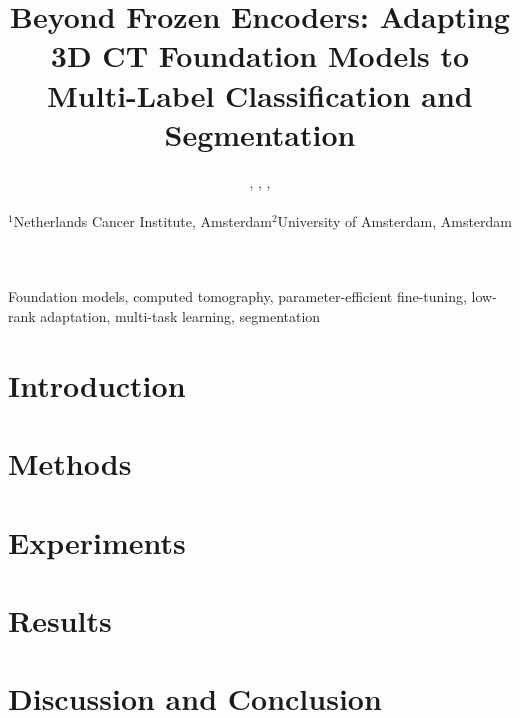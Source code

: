\documentclass{midl}
\title[Beyond frozen encoders]{Beyond Frozen Encoders: Adapting 3D CT Foundation Models to Multi-Label Classification and Segmentation}
\author[Yiasemis et al.]{%
\Name{George Yiasemis\midljointauthortext{Equal contribution.}\nametag{$^{1}$}},
\Name{Razvan-Andrei Matisan\midlotherjointauthor\nametag{$^{1}$}},
\Name{Cees Snoek\nametag{$^{2}$}},
\Name{Jonas Teuwen\nametag{$^{1}$}}\\
\Email{g.yiasemis@nki.nl}\\
\addr $^{1}$Netherlands Cancer Institute, Amsterdam\qquad $^{2}$University of Amsterdam, Amsterdam
}
\begin{document}
\maketitle

\begin{abstract}

\end{abstract}

\begin{keywords}
Foundation models, computed tomography, parameter-efficient fine-tuning, low-rank adaptation, multi-task learning, segmentation
\end{keywords}

\setlength{\textfloatsep}{6pt plus 2pt minus 2pt}\setlength{\floatsep}{6pt plus 2pt minus 2pt}\setlength{\intextsep}{6pt plus 2pt minus 2pt}
\section{Introduction}
\label{sec:intro}


\section{Methods}
\label{sec:methods}


\section{Experiments}
\label{sec:setup}


\section{Results}
\label{sec:results}


\section{Discussion and Conclusion}
\label{sec:discussion}\label{sec:guide}


\clearpage
\setlength{\textfloatsep}{10pt plus 2pt minus 4pt}\setlength{\floatsep}{8pt plus 2pt minus 2pt}\setlength{\intextsep}{8pt plus 2pt minus 2pt}


\appendix

\end{document}
